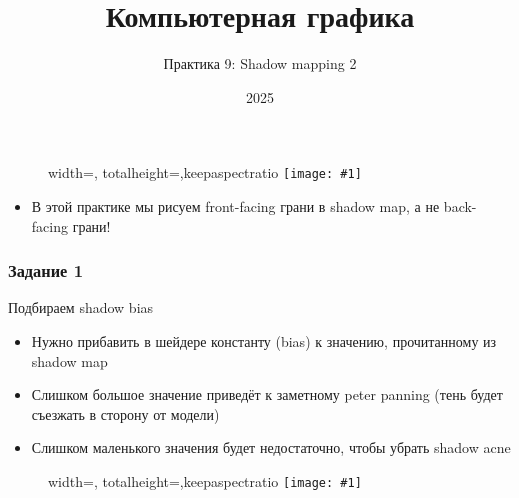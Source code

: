 \documentclass[10pt]{beamer}
\title{Компьютерная графика}
\subtitle{Практика 9: Shadow mapping 2}
\date{2025}
\newcommand{\slideimage}[1]{
  \begin{figure}
    \begin{adjustbox}{width=\textwidth, totalheight=\textheight-2\baselineskip-2\baselineskip,keepaspectratio}
      \texttt{[image: \#1]}
    \end{adjustbox}
  \end{figure}
}
\begin{document}

\frame{\titlepage}

\begin{frame}[fragile]
\slideimage{0.png}
\end{frame}

\begin{frame}[fragile]
\begin{itemize}
\item В этой практике мы рисуем front-facing грани в shadow map, а не back-facing грани!
\end{itemize}
\end{frame}

\begin{frame}[fragile]
\frametitle{Задание 1}
Подбираем shadow bias
\begin{itemize}
\item Нужно прибавить в шейдере константу (bias) к значению, прочитанному из shadow map
\item Слишком большое значение приведёт к заметному peter panning (тень будет съезжать в сторону от модели)
\item Слишком маленького значения будет недостаточно, чтобы убрать shadow acne
\end{itemize}
\end{frame}

\begin{frame}[fragile]
\slideimage{1.png}
\end{frame}
\end{document}
